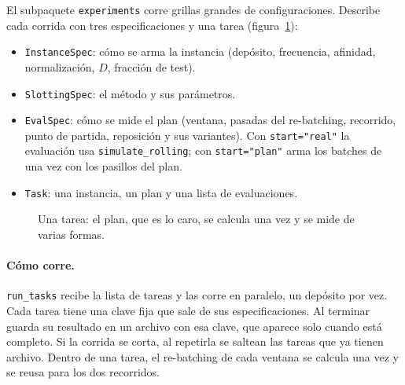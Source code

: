 \documentclass[11pt,a4paper,oneside]{report}
\newcommand{\code}[1]{\texttt{\small #1}}
\begin{document}
El subpaquete \code{experiments} corre grillas grandes de configuraciones. Describe cada corrida
con tres especificaciones y una tarea (figura~\ref{fig:tarea}):

\begin{itemize}
  \item \code{InstanceSpec}: cómo se arma la instancia (depósito, frecuencia, afinidad,
        normalización, $D$, fracción de test).
  \item \code{SlottingSpec}: el método y sus parámetros.
  \item \code{EvalSpec}: cómo se mide el plan (ventana, pasadas del re-batching, recorrido,
        punto de partida, reposición y sus variantes). Con
        \code{start="real"} la evaluación usa \code{simulate\_rolling}; con
        \code{start="plan"} arma los batches de una vez con los pasillos del plan.
  \item \code{Task}: una instancia, un plan y una lista de evaluaciones.
\end{itemize}

\begin{figure}[ht]
\centering
{}
\caption{Una tarea: el plan, que es lo caro, se calcula una vez y se mide de varias formas.}
\label{fig:tarea}
\end{figure}

\paragraph{Cómo corre.} \code{run\_tasks} recibe la lista de tareas y las corre en paralelo, un
depósito por vez. Cada tarea tiene una clave fija que sale de sus especificaciones. Al terminar
guarda su resultado en un archivo con esa clave, que aparece solo cuando está completo. Si la
corrida se corta, al repetirla se saltean las tareas que ya tienen archivo. Dentro de una tarea,
el re-batching de cada ventana se calcula una vez y se reusa para los dos recorridos.
\end{document}
